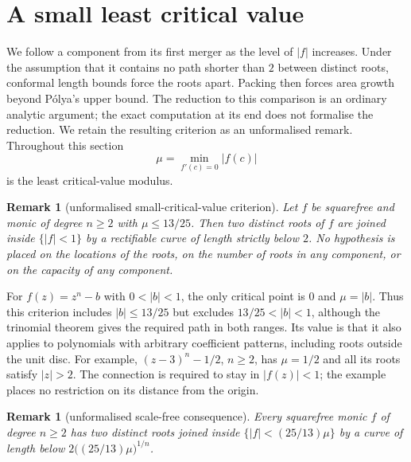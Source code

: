 \documentclass[11pt]{article}
\newtheorem{remark}[theorem]{Remark}
\begin{document}
\section{A small least critical value}
\label{sec:low-critical-closure}

We follow a component from its first merger as the level of $|f|$
increases. Under the assumption that it contains no path shorter than
$2$ between distinct roots, conformal length bounds force the roots
apart. Packing then forces area growth beyond P\'olya's upper bound.
The reduction to this comparison is an ordinary analytic argument;
the exact computation at its end does not formalise the reduction.
We retain the resulting criterion as an unformalised remark.
Throughout this section
\[
 \mu=\min_{f'(c)=0}|f(c)|
\]
is the least critical-value modulus.

\begin{remark}[unformalised small-critical-value criterion]
\label{res:low-critical-thirteen-twentyfifths}
Let $f$ be squarefree and monic of degree $n\ge2$ with $\mu\le13/25$.  Then
two distinct roots of $f$ are joined inside $\{|f|<1\}$ by a rectifiable
curve of length strictly below $2$.  No hypothesis is placed on the locations
of the roots, on the number of roots in any component, or on the capacity of
any component.
\end{remark}


For $f(z)=z^n-b$ with $0<|b|<1$, the only critical point is $0$ and
$\mu=|b|$. Thus this criterion includes $|b|\le13/25$ but excludes
$13/25<|b|<1$, although the trinomial theorem gives the required path
in both ranges. Its value is that it also applies to polynomials with
arbitrary coefficient patterns, including roots outside the unit disc. For example,
$(z-3)^n-1/2$, $n\ge2$, has $\mu=1/2$ and all its roots satisfy
$|z|>2$. The connection is required to stay in $|f(z)|<1$; the example places
no restriction on its distance from the origin.

\begin{remark}[unformalised scale-free consequence]
\label{res:low-critical-scale-free}
Every squarefree monic $f$ of degree $n\ge2$ has two distinct roots joined
inside $\{|f|<(25/13)\mu\}$ by a curve of length below
$2\bigl((25/13)\mu\bigr)^{1/n}$.
\end{remark}
\end{document}
